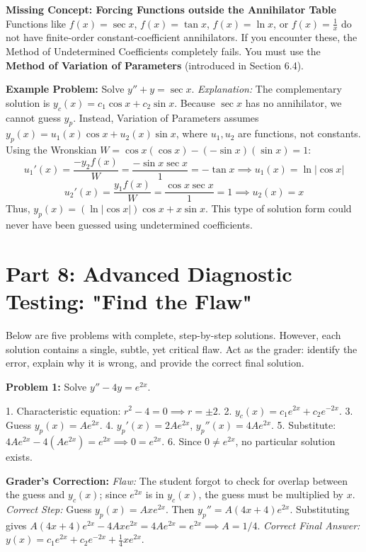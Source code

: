 \documentclass[11pt]{article}
\begin{document}
\textbf{Missing Concept: Forcing Functions outside the Annihilator Table}
Functions like $f(x) = \sec x$, $f(x) = \tan x$, $f(x) = \ln x$, or $f(x) = \frac{1}{x}$ do not have finite-order constant-coefficient annihilators. If you encounter these, the Method of Undetermined Coefficients completely fails. You must use the \textbf{Method of Variation of Parameters} (introduced in Section 6.4).

\textbf{Example Problem:} Solve $y'' + y = \sec x$.
\textit{Explanation:} The complementary solution is $y_c(x) = c_1 \cos x + c_2 \sin x$. Because $\sec x$ has no annihilator, we cannot guess $y_p$. Instead, Variation of Parameters assumes $y_p(x) = u_1(x) \cos x + u_2(x) \sin x$, where $u_1, u_2$ are functions, not constants.
Using the Wronskian $W = \cos x (\cos x) - (-\sin x)(\sin x) = 1$:
\[ u_1'(x) = \frac{-y_2 f(x)}{W} = \frac{-\sin x \sec x}{1} = -\tan x \implies u_1(x) = \ln|\cos x| \]
\[ u_2'(x) = \frac{y_1 f(x)}{W} = \frac{\cos x \sec x}{1} = 1 \implies u_2(x) = x \]
Thus, $y_p(x) = (\ln|\cos x|)\cos x + x \sin x$. This type of solution form could never have been guessed using undetermined coefficients.

\newpage
\section{Part 8: Advanced Diagnostic Testing: "Find the Flaw"}

Below are five problems with complete, step-by-step solutions. However, each solution contains a single, subtle, yet critical flaw. Act as the grader: identify the error, explain why it is wrong, and provide the correct final solution.

\vspace{0.5cm}
\textbf{Problem 1:} Solve $y'' - 4y = e^{2x}$.
\begin{tcolorbox}[colback=red!5,colframe=red!40!black,title=Flawed Solution]
1. Characteristic equation: $r^2 - 4 = 0 \implies r = \pm 2$.
2. $y_c(x) = c_1 e^{2x} + c_2 e^{-2x}$.
3. Guess $y_p(x) = A e^{2x}$.
4. $y_p'(x) = 2A e^{2x}$, $y_p''(x) = 4A e^{2x}$.
5. Substitute: $4A e^{2x} - 4(A e^{2x}) = e^{2x} \implies 0 = e^{2x}$.
6. Since $0 \neq e^{2x}$, no particular solution exists.
\end{tcolorbox}
\textbf{Grader's Correction:}
\textit{Flaw:} The student forgot to check for overlap between the guess and $y_c(x)$; since $e^{2x}$ is in $y_c(x)$, the guess must be multiplied by $x$.
\textit{Correct Step:} Guess $y_p(x) = A x e^{2x}$. Then $y_p'' = A(4x + 4)e^{2x}$. Substituting gives $A(4x + 4)e^{2x} - 4A x e^{2x} = 4A e^{2x} = e^{2x} \implies A = 1/4$.
\textit{Correct Final Answer:} $y(x) = c_1 e^{2x} + c_2 e^{-2x} + \frac{1}{4} x e^{2x}$.
\end{document}
